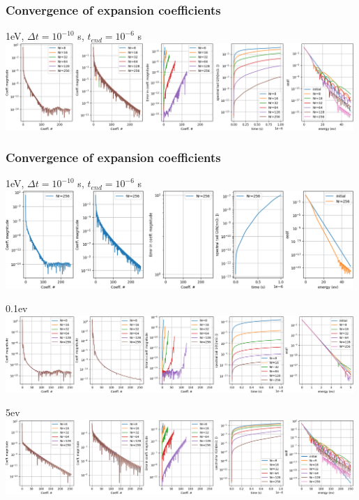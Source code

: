 \documentclass[mathserif, aspectratio=169]{beamer}
\begin{document}
\begin{frame}
\frametitle{Convergence of expansion coefficients}
1eV, $\Delta t = 10^{-10}$ s, $t_{end} = 10^{-6}$ s\\
\includegraphics[width=0.99\textwidth]{figures/expansion_1ev.png}
\end{frame}

\begin{frame}
\frametitle{Convergence of expansion coefficients}
1eV, $\Delta t = 10^{-10}$ s, $t_{end} = 10^{-6}$ s\\
\includegraphics[width=0.99\textwidth]{figures/expansion_1ev_256.png}
\end{frame}

\begin{frame}
0.1ev\\
\includegraphics[width=0.99\textwidth]{figures/expansion_01ev.png}

5ev \\
\includegraphics[width=0.99\textwidth]{figures/expansion_5ev.png}
\end{frame}
\end{document}
